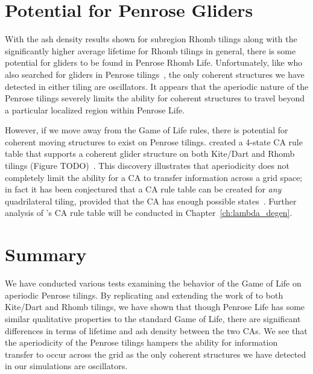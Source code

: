 \documentclass[a4paper,11pt]{report}
\begin{document}
\section{Potential for Penrose Gliders}
With the ash density results shown for subregion Rhomb tilings along with the significantly higher average lifetime for Rhomb tilings in general, there is some potential for gliders to be found in Penrose Rhomb Life. Unfortunately, like \citeauthor{ow10} who also searched for gliders in Penrose tilings~\cite{ow10}, the only coherent structures we have detected in either tiling are oscillators. It appears that the aperiodic nature of the Penrose tilings severely limits the ability for coherent structures to travel beyond a particular localized region within Penrose Life. 

However, if we move away from the Game of Life rules, there is potential for coherent moving structures to exist on Penrose tilings. \citeauthor{go12} created a 4-state CA rule table that supports a coherent glider structure on both Kite/Dart and Rhomb tilings (Figure TODO)~\cite{go12}. This discovery illustrates that aperiodicity does not completely limit the ability for a CA to transfer information across a grid space; in fact it has been conjectured that a CA rule table can be created for \textit{any} quadrilateral tiling, provided that the CA has enough possible states~\cite{mu16}. Further analysis of \citeauthor{go12}'s CA rule table will be conducted in Chapter~\ref{ch:lambda_degen}.

\section{Summary}
We have conducted various tests examining the behavior of the Game of Life on aperiodic Penrose tilings. By replicating and extending the work of \citeauthor{hi05} to both Kite/Dart and Rhomb tilings, we have shown that though Penrose Life has some similar qualitative properties to the standard Game of Life, there are significant differences in terms of lifetime and ash density between the two CAs. We see that the aperiodicity of the Penrose tilings hampers the ability for information transfer to occur across the grid as the only coherent structures we have detected in our simulations are oscillators. 
\end{document}
